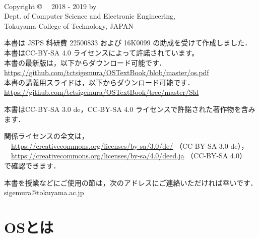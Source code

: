 \documentclass[a4paper,11pt,twocolumn]{ltjsbook}     %
\begin{document}
\thispagestyle{empty}
\onecolumn
~
\vfill
\begin{flushleft}
Copyright \copyright ~~ 2018 - 2019 by \\
Dept. of Computer Science and Electronic Engineering, \\
Tokuyama College of Technology, JAPAN
\end{flushleft}
\vspace{0.4cm}
\begin{flushleft}
本書は JSPS 科研費 22500833 および 16K0099 の助成を受けて作成しました．\\
本書はCC-BY-SA 4.0 ライセンスによって許諾されています。\\
本書の最新版は，以下からダウンロード可能です．\\
\url{https://github.com/tctsigemura/OSTextBook/blob/master/os.pdf}\\
本書の講義用スライドは，以下からダウンロード可能です．\\
\url{https://github.com/tctsigemura/OSTextBook/tree/master/Sld}
\end{flushleft}
\begin{flushleft}
本書はCC-BY-SA 3.0 de，CC-BY-SA 4.0 ライセンスで許諾された著作物を含みます．
\end{flushleft}
\begin{flushleft}
関係ライセンスの全文は，\\
　\url{https://creativecommons.org/licenses/by-sa/3.0/de/}
（CC-BY-SA 3.0 de），\\
　\url{https://creativecommons.org/licenses/by-sa/4.0/deed.ja}
（CC-BY-SA 4.0）\\
で確認できます．
\end{flushleft}
\begin{flushleft}
本書を授業などにご使用の節は，次のアドレスにご連絡いただければ幸いです．\\
sigemura@tokuyama.ac.jp
\end{flushleft}

\setcounter{tocdepth}{1}
\tableofcontents

\mainmatter

\part{OSとは}
\end{document}
